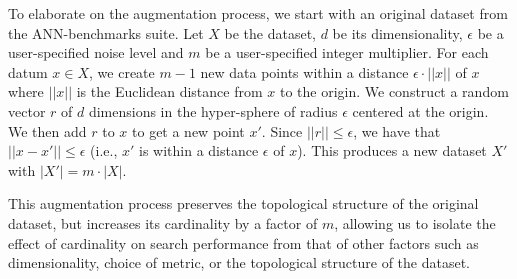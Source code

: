 To elaborate on the augmentation process, we start with an original dataset from the ANN-benchmarks suite.
Let $X$ be the dataset, $d$ be its dimensionality, $\epsilon$ be a user-specified noise level and $m$ be a user-specified integer multiplier.
For each datum $x \in X$, we create $m - 1$ new data points within a distance $\epsilon \cdot ||x||$ of $x$ where $||x||$ is the Euclidean distance from $x$ to the origin.
We construct a random vector $r$ of $d$ dimensions in the hyper-sphere of radius $\epsilon$ centered at the origin.
We then add $r$ to $x$ to get a new point $x'$.
Since $||r|| \leq \epsilon$, we have that $||x - x'|| \leq \epsilon$ (i.e., $x'$ is within a distance $\epsilon$ of $x$).
This produces a new dataset $X'$ with $|X'| = m \cdot |X|$.

This augmentation process preserves the topological structure of the original dataset, but increases its cardinality by a factor of $m$, allowing us to isolate the effect of cardinality on search performance from that of other factors such as dimensionality, choice of metric, or the topological structure of the dataset.

